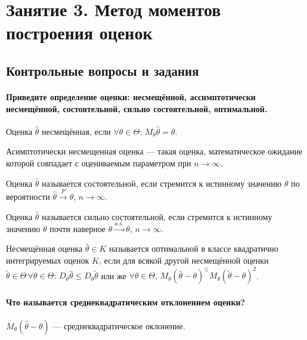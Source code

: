 \chapter*{Занятие 3. Метод моментов построения оценок}

\section*{Контрольные вопросы и задания}

\subsubsection*{Приведите определение оценки: несмещённой, ассимптотически несмещённой,
                состоятельной, сильно состоятельной, оптимальной.}

Оценка $ \hat{ \theta}$  несмещённая,
если $ \forall \theta \in \Theta: \, M_{ \theta } \hat{ \theta } = \theta $.

Асимптотически несмещенная оценка --- такая оценка,
математическое ожидание которой совпадает с оцениваемым параметром при $n \to \infty $.

Оценка $ \hat{ \theta }$ называется состоятельной,
если стремится к истинному значению $ \theta $ по вероятности
$ \hat{ \theta } \overset{P}{ \rightarrow } \theta, \,
  n \to \infty $.

Оценка $ \hat{ \theta }$ называется сильно состоятельной,
если стремится к истинному значению $ \theta $ почти наверное
$ \hat{ \theta } \overset{a.s.}{ \rightarrow } \theta, \,
  n \to \infty $.

Несмещённая оценка $ \hat{ \theta } \in K$
называется оптимальной в классе квадратично интегрируемых оценок $K$,
если для всякой другой несмещённой оценки
$ \tilde{ \theta } \in \Theta \,
  \forall \theta \in \Theta: \,
  D_{ \theta } \hat{ \theta } \leq D_{ \theta } \tilde{ \theta }$
или же
$ \forall \theta \in \Theta, \,
  M_{ \theta } \left( \hat{ \theta } - \theta \right)^ \leq
  M_{ \theta } \left( \tilde{ \theta } - \theta \right)^2$.

\subsubsection*{Что называется среднеквадратическим отклонением оценки?}

$M_{ \theta } \left( \hat{ \theta } - \theta \right) $ --- среднеквадратическое оклонение.

